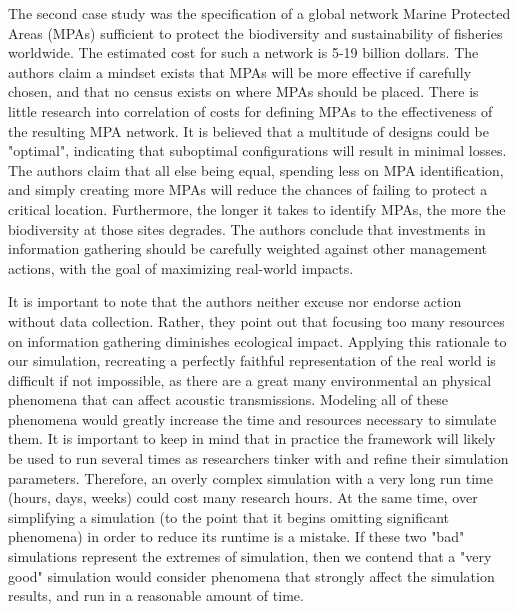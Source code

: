 The second case study was the specification of a global network Marine Protected Areas (MPAs) sufficient to protect the biodiversity and sustainability of fisheries worldwide.  The estimated cost for such a network is 5-19 billion dollars.  The authors claim a mindset exists that MPAs will be more effective if carefully chosen, and that no census exists on where MPAs should be placed. There is little research into correlation of costs for defining MPAs to the effectiveness of the resulting MPA network.  It is believed that a multitude of designs could be "optimal", indicating that suboptimal configurations will result in minimal losses.  The authors claim that all else being equal, spending less on MPA identification, and simply creating more MPAs will reduce the chances of failing to protect a critical location.  Furthermore, the longer it takes to identify MPAs, the more the biodiversity at those sites degrades.  The authors conclude that investments in information gathering should be carefully weighted against other management actions, with the goal of maximizing real-world impacts.

It is important to note that the authors neither excuse nor endorse action without data collection.  Rather, they point out that focusing too many resources on information gathering diminishes ecological impact.  Applying this rationale to our simulation, recreating a perfectly faithful representation of the real world is difficult if not impossible, as there are a great many environmental an physical phenomena that can affect acoustic transmissions.  Modeling all of these phenomena would greatly increase the time and resources necessary to simulate them.  It is important to keep in mind that in practice the framework will likely be used to run several times as researchers tinker with and refine their simulation parameters.  Therefore, an overly complex simulation with a very long run time (hours, days, weeks) could cost many research hours. At the same time, over simplifying a simulation (to the point that it begins omitting significant phenomena) in order to reduce its runtime is a mistake.  If these two "bad" simulations represent the extremes of simulation, then  we contend that a "very good" simulation would consider phenomena that strongly affect the simulation results, and run in a reasonable amount of time.  



